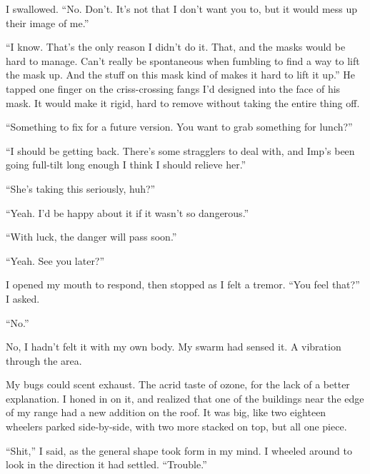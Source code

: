I swallowed.  ``No.  Don't.  It's not that I don't want you to, but it would mess up their image of me.''



``I know.  That's the only reason I didn't do it.  That, and the masks would be hard to manage.  Can't really be spontaneous when fumbling to find a way to lift the mask up.  And the stuff on this mask kind of makes it hard to lift it up.''  He tapped one finger on the criss-crossing fangs I'd designed into the face of his mask.  It would make it rigid, hard to remove without taking the entire thing off.



``Something to fix for a future version.  You want to grab something for lunch?''



``I should be getting back.  There's some stragglers to deal with, and Imp's been going full-tilt long enough I think I should relieve her.''



``She's taking this seriously, huh?''



``Yeah.  I'd be happy about it if it wasn't so dangerous.''



``With luck, the danger will pass soon.''



``Yeah.  See you later?''



I opened my mouth to respond, then stopped as I felt a tremor.  ``You feel that?'' I asked.



``No.''



No, I hadn't felt it with my own body.  My swarm had sensed it.  A vibration through the area.



My bugs could scent exhaust.  The acrid taste of ozone, for the lack of a better explanation.  I honed in on it, and realized that one of the buildings near the edge of my range had a new addition on the roof.  It was big, like two eighteen wheelers parked side-by-side, with two more stacked on top, but all one piece.



``Shit,'' I said, as the general shape took form in my mind.  I wheeled around to look in the direction it had settled.  ``Trouble.''



